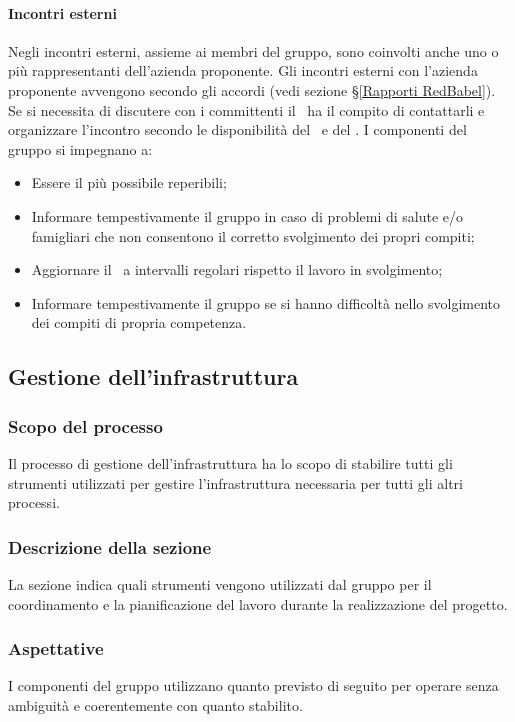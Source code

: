\paragraph*{Incontri esterni}
Negli incontri esterni, assieme ai membri del gruppo, sono coinvolti anche uno o più rappresentanti dell'azienda proponente.
Gli incontri esterni con l'azienda proponente avvengono secondo gli accordi (vedi sezione \S\ref{Rapporti RedBabel}). Se si necessita di discutere con i committenti il \Responsabile\ ha il compito di contattarli e organizzare l'incontro secondo le disponibilità del \VT\ e del \CR.
\label{NormeGenerali}I componenti del gruppo si impegnano a:
\begin{itemize}
	\item Essere il più possibile reperibili;
	\item Informare tempestivamente il gruppo in caso di problemi di salute e/o famigliari che non consentono il corretto svolgimento dei propri compiti;
	\item Aggiornare il \Responsabile\ a intervalli regolari rispetto il lavoro in svolgimento;
	\item Informare tempestivamente il gruppo se si hanno difficoltà nello svolgimento dei compiti di propria competenza.
\end{itemize}

\subsection{Gestione dell'infrastruttura}
\subsubsection{Scopo del processo}\label{PO_GestioneInfrastruttura_Scopo}
Il processo di gestione dell'infrastruttura ha lo scopo di stabilire tutti gli strumenti utilizzati per gestire l'infrastruttura necessaria per tutti gli altri processi.
\subsubsection{Descrizione della sezione}
La sezione indica quali strumenti vengono utilizzati dal gruppo per il coordinamento e la pianificazione del lavoro durante la realizzazione del progetto.
\subsubsection{Aspettative}
I componenti del gruppo utilizzano quanto previsto di seguito per operare senza ambiguità e coerentemente con quanto stabilito.
